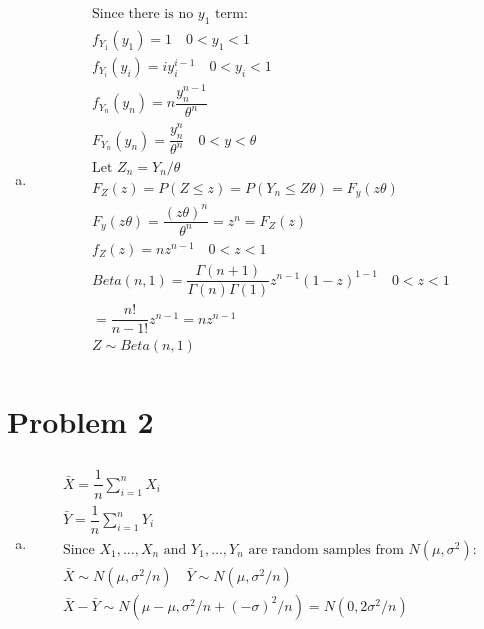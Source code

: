 \documentclass{article}
\begin{document}
\begin{flushleft}
\begin{enumerate}[(a)]
	\item 
\begin{multline*}\\
\text{Since there is no } y_1 \text{ term:}\\
f_{Y_1}(y_1)=1 \quad 0<y_1<1\\
f_{Y_i}(y_i)=iy_i^{i-1} \quad 0<y_i<1\\
f_{Y_n}(y_n)=n\dfrac{y_n^{n-1}}{\theta^n}\\
F_{Y_n}(y_n)=\dfrac{y_n^n}{\theta^n} \quad 0<y<\theta\\
\text{Let } Z_n=Y_n/\theta\\
F_Z(z)=P(Z\leq z)=P(Y_n\leq Z\theta)=F_y(z\theta)\\
F_y(z\theta)=\dfrac{(z\theta)^n}{\theta^n}=z^n=F_Z(z)\\
f_Z(z)=nz^{n-1} \quad 0<z<1\\
Beta(n,1)= \dfrac{\Gamma(n+1)}{\Gamma(n)\Gamma(1)}z^{n-1}(1-z)^{1-1} \quad 0<z<1\\
=\dfrac{n!}{n-1!}z^{n-1}=nz^{n-1}\\
Z\sim Beta(n,1)\\
\end{multline*}

\end{enumerate}

	\section*{Problem 2}
\begin{enumerate}[(a)]
	
	\item 
\begin{multline*}\\
\bar{X}=\dfrac{1}{n}\sum_{i=1}^{n}X_i\\
\bar{Y}=\dfrac{1}{n}\sum_{i=1}^{n}Y_i\\
\text{Since } X_1,\dots,X_n \text{ and } Y_1,\dots,Y_n \text{ are random samples from } N(\mu,\sigma^2):\\
\bar{X}\sim N(\mu,\sigma^2/n)\quad  \bar{Y}\sim N(\mu,\sigma^2/n)\\
\bar{X}-\bar{Y} \sim N(\mu-\mu,\sigma^2/n+(-\sigma)^2/n)=N(0,2\sigma^2/n)\\
\end{multline*}


\end{enumerate}
\end{flushleft}
\end{document}
